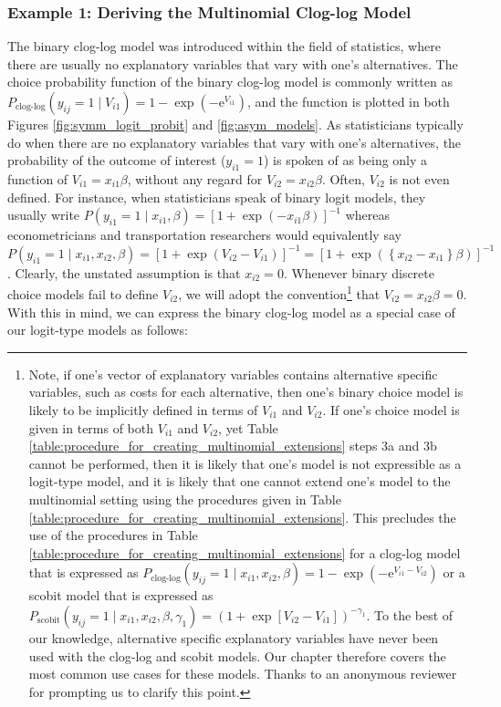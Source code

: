 \subsubsection{Example 1: Deriving the Multinomial Clog-log Model}
\label{sec:deriving_multinomial_cloglog}

The binary clog-log model \citep{fisher_mathematical_1922, yates_use_1955, mccullagh_generalized_1989} was introduced within the field of statistics, where there are usually no explanatory variables that vary with one's alternatives. The choice probability function of the binary clog-log model is commonly written as $P_{\textrm{clog-log}} \left( y_{ij} = 1 \mid V_{i1} \right) = 1 - \exp \left( - \mathrm{e}^{V_{i1}} \right)$, and the function is plotted in both Figures \ref{fig:symm_logit_probit} and \ref{fig:asym_models}. As statisticians typically do when there are no explanatory variables that vary with one's alternatives, the probability of the outcome of interest ($y_{i1} = 1$) is spoken of as being only a function of $V_{i1} = x_{i1} \beta$, without any regard for $V_{i2} = x_{i2} \beta$. Often, $V_{i2}$ is not even defined. For instance, when statisticians speak of binary logit models, they usually write $P \left( y_{i1} = 1 \mid x_{i1}, \beta \right) = \left[ 1 + \exp \left( - x_{i1} \beta \right) \right]^{-1}$ whereas econometricians and transportation researchers would equivalently say $P \left( y_{i1} = 1 \mid x_{i1}, x_{i2}, \beta \right) = \left[ 1 + \exp \left( V_{i2} - V_{i1} \right) \right]^{-1} = \left[ 1 + \exp \left( \left\lbrace x_{i2} - x_{i1} \right\rbrace \beta \right) \right]^{-1}$. Clearly, the unstated assumption is that $x_{i2} = 0$. Whenever binary discrete choice models fail to define $V_{i2}$, we will adopt the convention\footnote{Note, if one's vector of explanatory variables contains alternative specific variables, such as costs for each alternative, then one's binary choice model is likely to be implicitly defined in terms of $V_{i1}$ and $V_{i2}$. If one's choice model is given in terms of both $V_{i1}$ and $V_{i2}$, yet Table \ref{table:procedure_for_creating_multinomial_extensions} steps 3a and 3b cannot be performed, then it is likely that one's model is not expressible as a logit-type model, and it is likely that one cannot extend one's model to the multinomial setting using the procedures given in Table \ref{table:procedure_for_creating_multinomial_extensions}. This precludes the use of the procedures in Table \ref{table:procedure_for_creating_multinomial_extensions} for a clog-log model that is expressed as  $P_{\textrm{clog-log}} \left( y_{ij} = 1 \mid x_{i1}, x_{i2}, \beta \right) = 1 - \exp \left( - \mathrm{e}^{V_{i1} - V_{i2}} \right)$ or a scobit model that is expressed as $P_{\textrm{scobit}} \left( y_{ij} = 1 \mid x_{i1}, x_{i2}, \beta,  \gamma _1 \right) = \left( 1 + \exp\left[V_{i2} - V_{i1} \right] \right)^ {- \gamma _1}$. To the best of our knowledge, alternative specific explanatory variables have never been used with the clog-log and scobit models. Our chapter therefore covers the most common use cases for these models. Thanks to an anonymous reviewer for prompting us to clarify this point.} that $V_{i2} = x_{i2} \beta = 0$. With this in mind, we can express the binary clog-log model as a special case of our logit-type models as follows:

